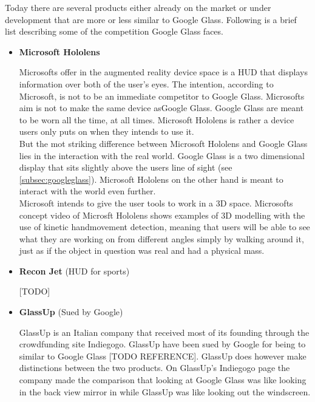 Today there are several products either already on the market or under development that are more or less similar to Google Glass. Following is a brief list describing some of the competition Google Glass faces.

\begin{itemize}
\item \textbf{Microsoft Hololens}\cite{hololens}

Microsofts offer in the augmented reality device space is a HUD that displays information over both of the user's eyes. The intention, according to Microsoft, is not to be an immediate competitor to Google Glass. Microsofts aim is not to make the same device asGoogle Glass. Google Glass are meant to be worn all the time, at all times. Microsoft Hololens is rather a device users only puts on when they intends to use it.\\

But the mot striking difference between Microsoft Hololens and Google Glass lies in the interaction with the real world. Google Glass is a two dimensional display that sits slightly above the users line of sight (see \ref{subsec:googleglass}). Microsoft Hololens on the other hand is meant to interact with the world even further. \\

Microsoft intends to give the user tools to work in a 3D space. Microsofts concept video\cite{hololensConceptVideo} of Microsft Hololens shows examples of 3D modelling with the use of kinetic handmovement detection, meaning that users will be able to see what they are working on from different angles simply by walking around it, just as if the object in question was real and had a physical mass.

\item \textbf{Recon Jet} (HUD for sports)

[TODO]

\item \textbf{GlassUp}\cite{glassUp} (Sued by Google)

GlassUp is an Italian company that received most of its founding through the crowdfunding site Indiegogo.\cite{glassUpIndiegogo} GlassUp have been sued by Google for being to similar to Google Glass [TODO REFERENCE]. GlassUp does however make distinctions between the two products. On GlassUp's Indiegogo page the company made the comparison that looking at Google Glass was like looking in the back view mirror in while GlassUp was like looking out the windscreen.\\


\end{itemize}
